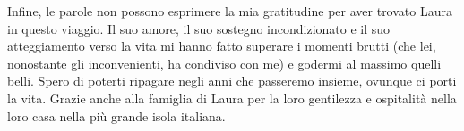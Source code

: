 Infine, le parole non possono esprimere la mia gratitudine per aver trovato Laura in questo viaggio. Il suo amore, il suo sostegno incondizionato e il suo atteggiamento verso la vita mi hanno fatto superare i momenti brutti (che lei, nonostante gli inconvenienti, ha condiviso con me) e godermi al massimo quelli belli. Spero di poterti ripagare negli anni che passeremo insieme, ovunque ci porti la vita. Grazie anche alla famiglia di Laura per la loro gentilezza e ospitalità nella loro casa nella più grande isola italiana.





%

